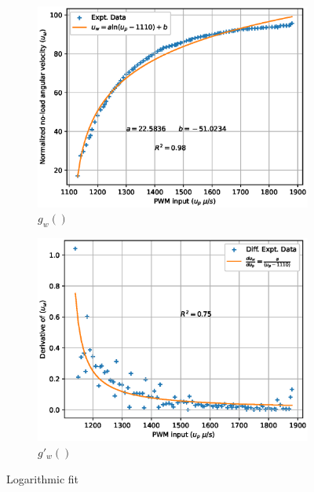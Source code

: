 \begin{figure}[H]
    \begin{minipage}{0.49\textwidth}
        \begin{figure}[H]
            \centering
            \includegraphics[width = \textwidth]{./figs/norm_omega/no-load_rpm.eps}
            \caption*{$g_w()$}
        \end{figure}
    \end{minipage}
    \begin{minipage}{0.49\textwidth}
        \begin{figure}[H]
            \centering
            \includegraphics[width = \textwidth]{./figs/norm_omega/no-load_rpm_derivative.eps}
            \caption*{$g'_w()$}
        \end{figure}
    \end{minipage}
    \caption{Logarithmic fit}
\end{figure}

